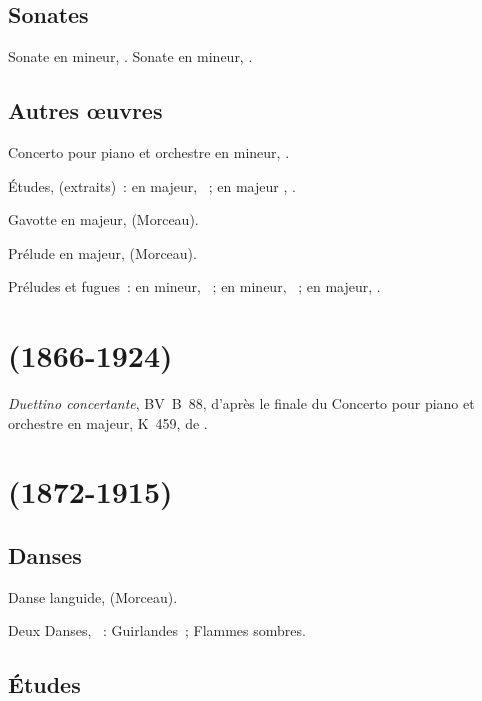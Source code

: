 \subsection{Sonates}

Sonate  en \kB \Flat mineur, .
Sonate  en \kE mineur, .

\subsection{Autres œuvres}

Concerto pour piano et orchestre  en \kF mineur, .

Études,  (extraits)~: en \kC majeur,  ~; en \kE
majeur ,  .

Gavotte en \kD majeur,   (Morceau).

Prélude en \kD \Flat majeur,   (Morceau).

Préludes et fugues~: en \kD mineur, ~; en \kA mineur, 
~; en \kC majeur,  .

\section[%
Ferruccio Busoni (1866-1924)]{%
\FBusoni{} (1866-1924)}

\emph{Duettino concertante}, BV~B~88, d'après le finale du Concerto pour
piano et orchestre  en \kF majeur, K~459, de \Mozart{}.

\section[%
Aleksandr Skrjabin (1872-1915)]{%
\AScriabine{} (1872-1915)}

\subsection{Danses}

Danse languide,   (Morceau).

Deux Danses, ~:  Guirlandes~;  Flammes sombres.

\subsection{Études}


